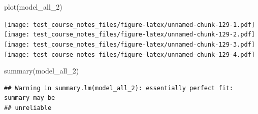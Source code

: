 \documentclass[
]{book}
\newenvironment{Shaded}{\begin{snugshade}}{\end{snugshade}}
\newcommand{\FunctionTok}[1]{\textcolor[rgb]{0.00,0.00,0.00}{#1}}
\newcommand{\NormalTok}[1]{#1}
\begin{document}
\begin{Shaded}
\begin{Highlighting}[]
\FunctionTok{plot}\NormalTok{(model\_all\_2)}
\end{Highlighting}
\end{Shaded}

\texttt{[image: test\_course\_notes\_files/figure-latex/unnamed-chunk-129-1.pdf]} \texttt{[image: test\_course\_notes\_files/figure-latex/unnamed-chunk-129-2.pdf]} \texttt{[image: test\_course\_notes\_files/figure-latex/unnamed-chunk-129-3.pdf]} \texttt{[image: test\_course\_notes\_files/figure-latex/unnamed-chunk-129-4.pdf]}

\begin{Shaded}
\begin{Highlighting}[]
\FunctionTok{summary}\NormalTok{(model\_all\_2)}
\end{Highlighting}
\end{Shaded}

\begin{verbatim}
## Warning in summary.lm(model_all_2): essentially perfect fit: summary may be
## unreliable
\end{verbatim}
\end{document}

